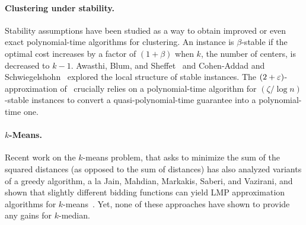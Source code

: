 \paragraph{Clustering under stability.}
Stability assumptions have been studied as a way to obtain improved or even exact polynomial-time algorithms for clustering. An instance is $\beta$-stable if the optimal cost increases by a factor of $(1+\beta)$ when $k$, the number of centers, is decreased to $k-1$. Awasthi, Blum, and Sheffet~\cite{ABS10} and Cohen-Addad and Schwiegelshohn~\cite{DBLP:conf/focs/Cohen-AddadS17} explored the local structure of stable instances. The $(2+\varepsilon)$-approximation of~\cite{MR4928455-Cohen25} crucially relies on a polynomial-time algorithm for $(\zeta/\log n)$-stable instances to convert a quasi-polynomial-time guarantee into a polynomial-time one.


\paragraph{$k$-Means.} Recent work on the $k$-means problem, that asks to minimize the sum of the squared distances (as opposed to the sum of distances) has also analyzed variants of a greedy algorithm, {a la Jain, Mahdian, Markakis, Saberi, and Vazirani}, and shown that slightly different bidding functions can yield LMP approximation algorithms for $k$-means~\cite{CharikarCGGLW25,CharikarCGGLW26}. Yet, none of these approaches have shown to provide any gains for $k$-median.